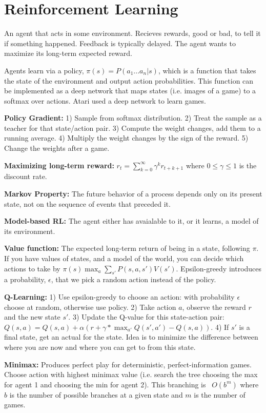 \section{Reinforcement Learning}
An agent that acts in some environment. Recieves rewards, good or bad, to tell it if something happened. Feedback is typically delayed. The agent wants to maximize its long-term expected reward.

Agents learn via a policy, $\pi(s) = P(a_1 ... a_n | s)$, which is a function that takes the state of the environment and output action probabilities. This function can be implemented as a deep network that maps states (i.e. images of a game) to a softmax over actions. Atari used a deep network to learn games.

\textbf{Policy Gradient:} 1) Sample from softmax distribution. 2) Treat the sample as a teacher for that state/action pair. 3) Compute the weight changes, add them to a running average. 4) Multiply the weight changes by the sign of the reward. 5) Change the weights after a game.

\textbf{Maximizing long-term reward:} $ r_t = \sum_{k = 0}^\infty \gamma^k r_{t + k + 1} $ where $0 \leq \gamma \leq 1$  is the discount rate.

\textbf{Markov Property:} The future behavior of a process depends only on its present state, not on the sequence of events that preceded it.

\textbf{Model-based RL:} The agent either has avaialable to it, or it learns, a model of its environment. 

\textbf{Value function:} The expected long-term return of being in a state, following $\pi$. If you have values of states, and a model of the world, you can decide which actions to take by $\pi(s) \max_a \sum_{s'}P(s,a,s')V(s')$. Epsilon-greedy introduces a probability, $\epsilon$, that we pick a random action instead of the policy.

\textbf{Q-Learning:} 1) Use epsilon-greedy to choose an action: with probability $\epsilon$ choose at random, otherwise use policy. 2) Take action $a$, observe the reward $r$ and the new state $s'$. 3) Update the Q-value for this state-action pair: $Q(s, a) = Q(s, a) + \alpha(r + \gamma * \max_{a'}Q(s', a') - Q(s, a))$. 4) If $s'$ is a final state, get an actual for the state. Idea is to minimize the difference between where you are now and where you can get to from this state.

\textbf{Minimax:} Produces perfect play for deterministic, perfect-information games. Choose action with highest minimax value (i.e. search the tree choosing the max for agent 1 and choosing the min for agent 2). This branching is ~$O(b^m)$ where $b$ is the number of possible branches at a given state and $m$ is the number of games.

